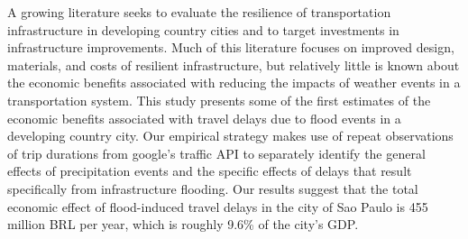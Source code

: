 \documentclass[11pt]{article}
\begin{document}
\hfill \break
A growing literature seeks to evaluate the resilience of transportation infrastructure in developing country cities and to target investments in infrastructure improvements.  Much of this literature focuses on improved design, materials, and costs of resilient infrastructure, but relatively little is known about the economic benefits associated with reducing the impacts of weather events in a transportation system.  This study presents some of the first estimates of the economic benefits associated with travel delays due to flood events in a developing country city.  Our empirical strategy makes use of repeat observations of trip durations from google's traffic API to separately identify the general effects of precipitation events and the specific effects of delays that result specifically from infrastructure flooding.  Our results suggest that the total economic effect of flood-induced travel delays in the city of Sao Paulo is 455 million BRL per year, which is roughly 9.6\% of the city's GDP.
\end{document}
